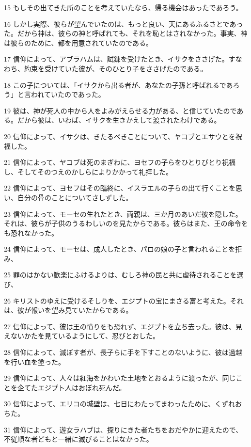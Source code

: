 \par 15 もしその出てきた所のことを考えていたなら、帰る機会はあったであろう。
\par 16 しかし実際、彼らが望んでいたのは、もっと良い、天にあるふるさとであった。だから神は、彼らの神と呼ばれても、それを恥とはされなかった。事実、神は彼らのために、都を用意されていたのである。
\par 17 信仰によって、アブラハムは、試錬を受けたとき、イサクをささげた。すなわち、約束を受けていた彼が、そのひとり子をささげたのである。
\par 18 この子については、「イサクから出る者が、あなたの子孫と呼ばれるであろう」と言われていたのであった。
\par 19 彼は、神が死人の中から人をよみがえらせる力がある、と信じていたのである。だから彼は、いわば、イサクを生きかえして渡されたわけである。
\par 20 信仰によって、イサクは、きたるべきことについて、ヤコブとエサウとを祝福した。
\par 21 信仰によって、ヤコブは死のまぎわに、ヨセフの子らをひとりびとり祝福し、そしてそのつえのかしらによりかかって礼拝した。
\par 22 信仰によって、ヨセフはその臨終に、イスラエルの子らの出て行くことを思い、自分の骨のことについてさしずした。
\par 23 信仰によって、モーセの生れたとき、両親は、三か月のあいだ彼を隠した。それは、彼らが子供のうるわしいのを見たからである。彼らはまた、王の命令をも恐れなかった。
\par 24 信仰によって、モーセは、成人したとき、パロの娘の子と言われることを拒み、
\par 25 罪のはかない歓楽にふけるよりは、むしろ神の民と共に虐待されることを選び、
\par 26 キリストのゆえに受けるそしりを、エジプトの宝にまさる富と考えた。それは、彼が報いを望み見ていたからである。
\par 27 信仰によって、彼は王の憤りをも恐れず、エジプトを立ち去った。彼は、見えないかたを見ているようにして、忍びとおした。
\par 28 信仰によって、滅ぼす者が、長子らに手を下すことのないように、彼は過越を行い血を塗った。
\par 29 信仰によって、人々は紅海をかわいた土地をとおるように渡ったが、同じことを企てたエジプト人はおぼれ死んだ。
\par 30 信仰によって、エリコの城壁は、七日にわたってまわったために、くずれおちた。
\par 31 信仰によって、遊女ラハブは、探りにきた者たちをおだやかに迎えたので、不従順な者どもと一緒に滅びることはなかった。
